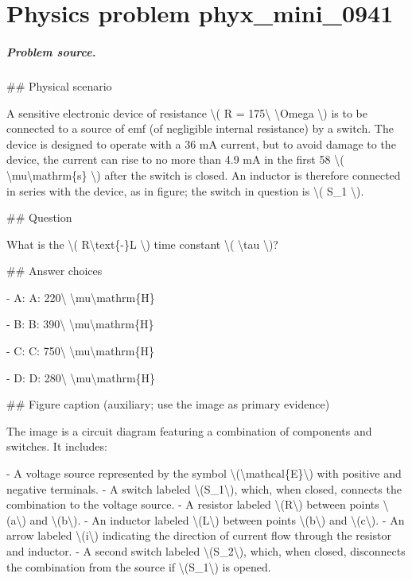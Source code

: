 
\chapter{Physics problem phyx\_mini\_0941}
\label{ch:PhyXMiniProblems_problem_phyx_mini_0941}

\paragraph{Problem source.}
\#\# Physical scenario

A sensitive electronic device of resistance \textbackslash{}( R = 175\textbackslash{} \textbackslash{}Omega \textbackslash{}) is to be connected to a source of emf (of negligible internal resistance) by a switch. The device is designed to operate with a 36 mA current, but to avoid damage to the device, the current can rise to no more than 4.9 mA in the first 58 \textbackslash{}( \textbackslash{}mu\textbackslash{}mathrm\{s\} \textbackslash{}) after the switch is closed. An inductor is therefore connected in series with the device, as in figure; the switch in question is \textbackslash{}( S\_1 \textbackslash{}).

\#\# Question

What is the \textbackslash{}( R\textbackslash{}text\{-\}L \textbackslash{}) time constant \textbackslash{}( \textbackslash{}tau \textbackslash{})?

\#\# Answer choices

- A: A: 220\textbackslash{} \textbackslash{}mu\textbackslash{}mathrm\{H\}

- B: B: 390\textbackslash{} \textbackslash{}mu\textbackslash{}mathrm\{H\}

- C: C: 750\textbackslash{} \textbackslash{}mu\textbackslash{}mathrm\{H\}

- D: D: 280\textbackslash{} \textbackslash{}mu\textbackslash{}mathrm\{H\}

\#\# Figure caption (auxiliary; use the image as primary evidence)

The image is a circuit diagram featuring a combination of components and switches. It includes:

- A voltage source represented by the symbol \textbackslash{}(\textbackslash{}mathcal\{E\}\textbackslash{}) with positive and negative terminals.
- A switch labeled \textbackslash{}(S\_1\textbackslash{}), which, when closed, connects the combination to the voltage source.
- A resistor labeled \textbackslash{}(R\textbackslash{}) between points \textbackslash{}(a\textbackslash{}) and \textbackslash{}(b\textbackslash{}).
- An inductor labeled \textbackslash{}(L\textbackslash{}) between points \textbackslash{}(b\textbackslash{}) and \textbackslash{}(c\textbackslash{}).
- An arrow labeled \textbackslash{}(i\textbackslash{}) indicating the direction of current flow through the resistor and inductor.
- A second switch labeled \textbackslash{}(S\_2\textbackslash{}), which, when closed, disconnects the combination from the source if \textbackslash{}(S\_1\textbackslash{}) is opened.

